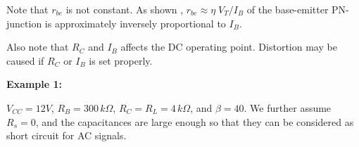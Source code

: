\documentclass{article}
\begin{document}
\begin{itemize}
  Note that $r_{be}$ is not constant. As shown 
  , 
  $r_{be}\approx \eta\;V_T/I_B$ of the base-emitter PN-junction is 
  approximately inversely proportional to $I_B$.

  Also note that $R_C$ and $I_B$ affects the DC operating point.
  Distortion may be caused if $R_C$ or $I_B$ is set properly.
  
\end{itemize}

{\bf Example 1:} 


$V_{CC}=12V$, $R_B=300\,k\Omega$, $R_C=R_L=4\,k\Omega$, and $\beta=40$. 
We further assume $R_s=0$, and the capacitances are large enough so 
that they can be considered as short circuit for AC signals.

\end{document}
